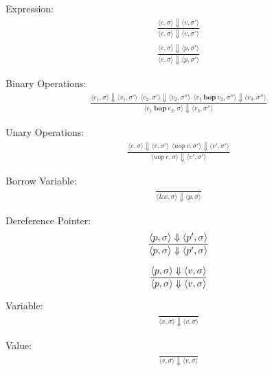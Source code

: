 \documentclass[12pt]{article}
\begin{document}
	Expression:
	\begin{align*}
		\frac{\langle e, \sigma \rangle\Downarrow \langle v, \sigma' \rangle}
		{\langle e, \sigma \rangle\Downarrow \langle v, \sigma' \rangle}
	\end{align*}
	\begin{align*}
		\frac{\langle e, \sigma \rangle\Downarrow \langle p, \sigma' \rangle}
		{\langle e, \sigma \rangle\Downarrow \langle p, \sigma' \rangle}
	\end{align*}

	Binary Operations:
	\begin{align*}
		\frac{\langle e_1, \sigma \rangle\Downarrow \langle v_1, \sigma' \rangle \ \
		\langle e_2, \sigma' \rangle\Downarrow \langle v_2, \sigma'' \rangle \ \
		\langle v_1\ \textbf{bop}\ v_2, \sigma'' \rangle\Downarrow \langle v_3, \sigma'' \rangle}
		{\langle e_1\ \textbf{bop}\ e_2, \sigma \rangle\Downarrow \langle v_3, \sigma'' \rangle}
	\end{align*}
	
	Unary Operations:
	\begin{align*}
		\frac{\langle e, \sigma \rangle\Downarrow \langle v, \sigma' \rangle \ \
		\langle uop\ v, \sigma' \rangle\Downarrow \langle v', \sigma' \rangle}
		{\langle uop\ e, \sigma \rangle\Downarrow \langle v', \sigma' \rangle}
	\end{align*}

	Borrow Variable:
	\begin{align*}
		\frac{}
		{\langle \&x, \sigma \rangle\Downarrow \langle p, \sigma \rangle}
	\end{align*}

	Dereference Pointer:
	\begin{align*}
		\frac{\langle \*p, \sigma \rangle\Downarrow \langle p', \sigma \rangle}
		{\langle \*p, \sigma \rangle\Downarrow \langle p', \sigma \rangle}
	\end{align*}

	\begin{align*}
		\frac{\langle \*p, \sigma \rangle\Downarrow \langle v, \sigma \rangle}
		{\langle \*p, \sigma \rangle\Downarrow \langle v, \sigma \rangle}
	\end{align*}	

	Variable:
	\begin{align*}
		\frac{}
		{\langle x, \sigma \rangle\Downarrow \langle v, \sigma \rangle}
	\end{align*}

	Value:
	\begin{align*}
		\frac{}
		{\langle v, \sigma \rangle\Downarrow \langle v, \sigma \rangle}
	\end{align*}
\end{document}
